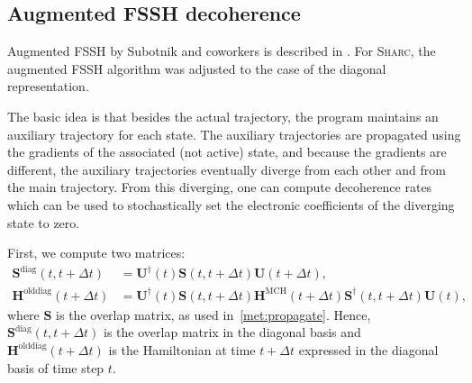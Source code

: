 \documentclass[a4paper,10pt,DIV=15,openany]{scrbook}
\newcommand{\sharc}{\textsc{Sharc}}
\newcommand{\VEC}[1]{\ensuremath{\mathbf{#1}}}
\begin{document}
\subsection{Augmented FSSH decoherence}

Augmented FSSH by Subotnik and coworkers is described in \cite{Jain2016JCTC}.
For \sharc, the augmented FSSH algorithm was adjusted to the case of the diagonal representation.

The basic idea is that besides the actual trajectory, the program maintains an auxiliary trajectory for each state.
The auxiliary trajectories are propagated using the gradients of the associated (not active) state, and because the gradients are different, the auxiliary trajectories eventually diverge from each other and from the main trajectory.
From this diverging, one can compute decoherence rates which can be used to stochastically set the electronic coefficients of the diverging state to zero.

First, we compute two matrices:
\begin{align}
  \VEC{S}^\text{diag}(t,t+\Delta t)&=\VEC{U}^\dagger(t)\VEC{S}(t,t+\Delta t)\VEC{U}(t+\Delta t),\\
  \VEC{H}^\text{olddiag}(t+\Delta t)&=\VEC{U}^\dagger(t)\VEC{S}(t,t+\Delta t)\VEC{H}^\text{MCH}(t+\Delta t)\VEC{S}^\dagger(t,t+\Delta t)\VEC{U}(t),
\end{align}
where $\VEC{S}$ is the overlap matrix, as used in~\ref{met:propagate}.
Hence, $\VEC{S}^\text{diag}(t,t+\Delta t)$ is the overlap matrix in the diagonal basis and $\VEC{H}^\text{olddiag}(t+\Delta t)$ is the Hamiltonian at time $t+\Delta t$ expressed in the diagonal basis of time step $t$.
\end{document}

